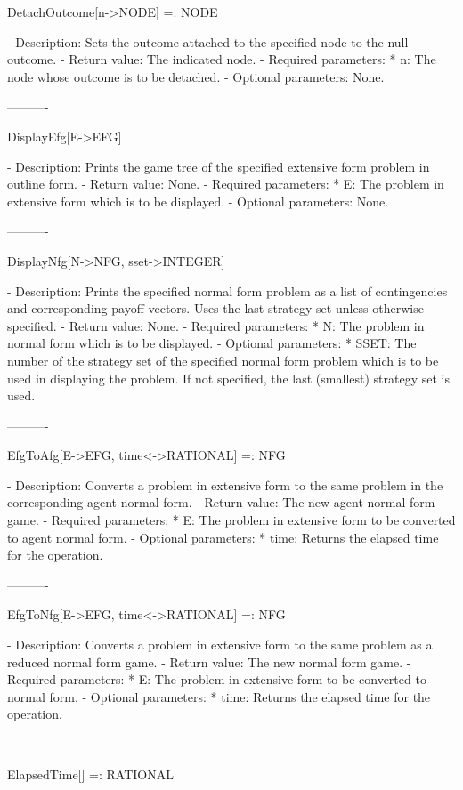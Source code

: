 DetachOutcome[n->NODE] =: NODE

   -	Description:  Sets the outcome attached to the specified node to the 
	null outcome.
   -	Return value:  The indicated node.
   -	Required parameters:
	  *  n:  The node whose outcome is to be detached.
   -	Optional parameters:  None.

----------

DisplayEfg[E->EFG]

   -	Description:  Prints the game tree of the specified extensive form
	problem in outline form.
   -	Return value:  None.
   -	Required parameters:
	  *  E:  The problem in extensive form which is to be displayed.
   -	Optional parameters:  None.

----------

DisplayNfg[N->NFG, {sset->INTEGER}]

   -	Description:  Prints the specified normal form problem as a list of
	contingencies and corresponding payoff vectors.  Uses the last strategy
	set unless otherwise specified.
   -	Return value:  None.
   -	Required parameters:
	  *  N:  The problem in normal form which is to be displayed.
   -	Optional parameters:
	  *  SSET:  The number of the strategy set of the specified normal form
		problem which is to be used in displaying the problem.  If not
		specified, the last (smallest) strategy set is used.

----------

EfgToAfg[E->EFG, {time<->RATIONAL}] =: NFG

   -	Description:  Converts a problem in extensive form to the same problem
	in the corresponding agent normal form.
   -	Return value:  The new agent normal form game.  
   -	Required parameters:
	  *  E:  The problem in extensive form to be converted to agent normal
		form.
   -	Optional parameters:
	  *  time:  Returns the elapsed time for the operation.

----------

EfgToNfg[E->EFG, {time<->RATIONAL}] =: NFG

   -	Description:  Converts a problem in extensive form to the same problem
	as a reduced normal form game.
   -	Return value:  The new normal form game.  
   -	Required parameters:
	  *  E:  The problem in extensive form to be converted to normal form.
   -	Optional parameters:
	  *  time:  Returns the elapsed time for the operation.

----------

ElapsedTime[] =: RATIONAL


